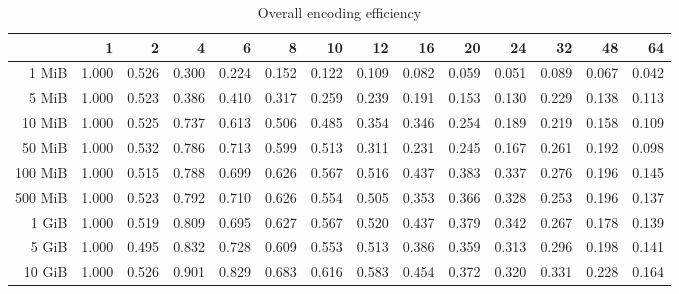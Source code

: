 \begin{table}[!h]
	\centering
	\caption{Overall encoding efficiency}
	\begin{tabular}{rrrrrrrrrrrrrr}
		\toprule
		\diagbox[width=7em]{Size}{Threads}&    1  &    2  &    4  &    6  &    8  &    10 &    12 &    16 &    20 &    24 &    32 &    48 &    64 \\
		\midrule
		1 MiB   & 1.000 & 0.526 & 0.300 & 0.224 & 0.152 & 0.122 & 0.109 & 0.082 & 0.059 & 0.051 & 0.089 & 0.067 & 0.042 \\
		5 MiB   & 1.000 & 0.523 & 0.386 & 0.410 & 0.317 & 0.259 & 0.239 & 0.191 & 0.153 & 0.130 & 0.229 & 0.138 & 0.113 \\
		10 MiB  & 1.000 & 0.525 & 0.737 & 0.613 & 0.506 & 0.485 & 0.354 & 0.346 & 0.254 & 0.189 & 0.219 & 0.158 & 0.109 \\
		50 MiB  & 1.000 & 0.532 & 0.786 & 0.713 & 0.599 & 0.513 & 0.311 & 0.231 & 0.245 & 0.167 & 0.261 & 0.192 & 0.098 \\
		100 MiB & 1.000 & 0.515 & 0.788 & 0.699 & 0.626 & 0.567 & 0.516 & 0.437 & 0.383 & 0.337 & 0.276 & 0.196 & 0.145 \\
		500 MiB & 1.000 & 0.523 & 0.792 & 0.710 & 0.626 & 0.554 & 0.505 & 0.353 & 0.366 & 0.328 & 0.253 & 0.196 & 0.137 \\
		1 GiB   & 1.000 & 0.519 & 0.809 & 0.695 & 0.627 & 0.567 & 0.520 & 0.437 & 0.379 & 0.342 & 0.267 & 0.178 & 0.139 \\
		5 GiB   & 1.000 & 0.495 & 0.832 & 0.728 & 0.609 & 0.553 & 0.513 & 0.386 & 0.359 & 0.313 & 0.296 & 0.198 & 0.141 \\
		10 GiB  & 1.000 & 0.526 & 0.901 & 0.829 & 0.683 & 0.616 & 0.583 & 0.454 & 0.372 & 0.320 & 0.331 & 0.228 & 0.164 \\
		\bottomrule
	\end{tabular}
\end{table}
